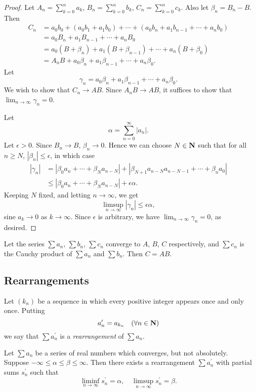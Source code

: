 \begin{proof}
Let $\displaystyle A_n=\sum_{k=0}^{n}a_k$, $\displaystyle B_n=\sum_{k=0}^{n}b_k$, $\displaystyle C_n=\sum_{k=0}^{n}c_k$. Also let $\beta_n=B_n-B$. Then 
\begin{align*}
C_n&=a_0b_0+(a_0b_1+a_1b_0)+\cdots+(a_0b_n+a_1b_{n-1}+\cdots+a_nb_0)\\
&=a_0B_n+a_1B_{n-1}+\cdots+a_nB_0\\
&=a_0(B+\beta_n)+a_1(B+\beta_{n-1})+\cdots+a_n(B+\beta_0)\\
&=A_nB+a_0\beta_n+a_1\beta_{n-1}+\cdots+a_n\beta_0.
\end{align*}
Let
\[\gamma_n=a_0\beta_n+a_1\beta_{n-1}+\cdots+a_n\beta_0.\]
We wish to show that $C_n\to AB$. Since $A_nB\to AB$, it suffices to show that $\displaystyle\lim_{n\to\infty}\gamma_n=0$.

Let 
\[\alpha=\sum_{n=0}^{\infty}|a_n|.\]
Let $\epsilon>0$. Since $B_n\to B$, $\beta_n\to0$. Hence we can choose $N\in\mathbf N$ such that for all $n\ge N$, $|\beta_n|\le\epsilon$, in which case
\begin{align*}
|\gamma_n|&=|\beta_0a_n+\cdots+\beta_Na_{n-N}|+|\beta_{N+1}a_{n-N}a_{n-N-1}+\cdots+\beta_na_0|\\
&\le|\beta_0a_n+\cdots+\beta_Na_{n-N}|+\epsilon\alpha.
\end{align*}
Keeping $N$ fixed, and letting $n\to\infty$, we get
\[\limsup_{n\to\infty}|\gamma_n|\le\epsilon\alpha,\]
sine $a_k\to0$ as $k\to\infty$. Since $\epsilon$ is arbitrary, we have $\displaystyle\lim_{n\to\infty}\gamma_n=0$, as desired.
\end{proof}

\begin{theorem}[Abel]
Let the series $\sum a_n$, $\sum b_n$, $\sum c_n$ converge to $A$, $B$, $C$ respectively, and $\sum c_n$ is the Cauchy product of $\sum a_n$ and $\sum b_n$. Then $C=AB$.
\end{theorem}

\subsection{Rearrangements}
\begin{definition}[Rearrangement]
Let $(k_n)$ be a sequence in which every positive integer appears once and only once. Putting
\[a_n^\prime=a_{k_n}\quad(\forall n\in\mathbf N)\]
we say that $\sum a_n^\prime$ is a \emph{rearrangement} of $\sum a_n$.
\end{definition}

\begin{proposition}
Let $\sum a_n$ be a series of real numbers which converges, but not absolutely. Suppose $-\infty\le\alpha\le\beta\le\infty$. Then there exists a rearrangement $\sum a_n^\prime$ with partial sums $s_n^\prime$ such that
\[\liminf_{n\to\infty}s_n^\prime=\alpha,\quad\limsup_{n\to\infty}s_n^\prime=\beta.\]
\end{proposition}

